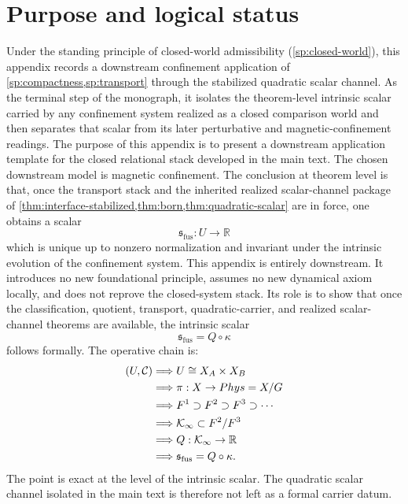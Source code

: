 \section{Purpose and logical status}
\label{sec:fusion-purpose}
Under the standing principle of closed-world admissibility
(\cref{sp:closed-world}), this appendix records a downstream
confinement application of \cref{sp:compactness,sp:transport} through
the stabilized quadratic scalar channel.
As the terminal step of the monograph, it isolates the theorem-level
intrinsic scalar carried by any confinement system realized as a closed
comparison world and then separates that scalar from its later
perturbative and magnetic-confinement readings.
The purpose of this appendix is to present a downstream application
template for the closed relational stack developed in the main text.
The chosen downstream model is magnetic confinement.
The conclusion at theorem level is that, once the transport stack and
the inherited realized scalar-channel package of
\cref{thm:interface-stabilized,thm:born,thm:quadratic-scalar} are in
force, one obtains a scalar
\[
	\mathfrak s_{\mathrm{fus}}:U\to\mathbb R
\]
which is unique up to nonzero normalization and invariant under the
intrinsic evolution of the confinement system.
This appendix is entirely downstream.
It introduces no new foundational principle, assumes no new dynamical
axiom locally, and does not reprove the closed-system stack.
Its role is to show that once the classification, quotient,
transport, quadratic-carrier, and realized scalar-channel theorems are
available, the intrinsic scalar
\[
	\mathfrak s_{\mathrm{fus}}=Q\circ \kappa
\]
follows formally.
The operative chain is:
\begin{align*}
	(U,\mathcal C)
	 & \Longrightarrow U\cong X_A\times X_B                    \\
	 & \Longrightarrow \pi:X\to Phys=X/G                      \\
	 & \Longrightarrow F^1\supset F^2\supset F^3\supset \cdots \\
	 & \Longrightarrow \mathcal K_\infty\subset F^2/F^3        \\
	 & \Longrightarrow Q:\mathcal K_\infty\to\mathbb R       \\
	 & \Longrightarrow \mathfrak s_{\mathrm{fus}}=Q\circ \kappa .
\end{align*}
The point is exact at the level of the intrinsic scalar.
The quadratic scalar channel isolated in the main text is therefore not
left as a formal carrier datum.
